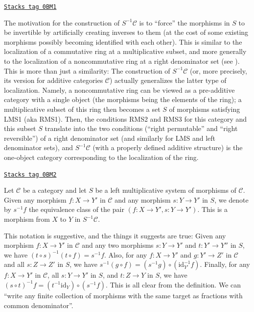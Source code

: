 \begin{remark}
\label{categories-remark-motivation-localization}
\href{https://stacks.math.columbia.edu/tag/0BM1}{\texttt{Stacks tag 0BM1}}

The motivation for the construction of $S^{-1} \mathcal{C}$ is to
``force'' the morphisms in $S$ to be invertible by artificially
creating inverses to them (at the cost of some existing morphisms
possibly becoming identified with each other). This is similar to
the localization of a commutative ring at a multiplicative subset,
and more generally to the localization of a noncommutative ring
at a right denominator set (see \cite[Section 10A]{Lam}). This is
more than just a similarity: The construction of
$S^{-1} \mathcal{C}$ (or, more precisely, its version for
additive categories $\mathcal{C}$) actually generalizes the
latter type of localization. Namely, a noncommutative ring can be
viewed as a pre-additive category with a single object (the morphisms
being the elements of the ring); a multiplicative subset of this
ring then becomes a set $S$ of morphisms satisfying LMS1 (aka
RMS1). Then, the conditions RMS2 and RMS3 for this category and
this subset $S$ translate into the two conditions
(``right permutable'' and ``right reversible'') of a right
denominator set (and similarly for LMS and left denominator sets),
and $S^{-1} \mathcal{C}$ (with a properly defined additive
structure) is the one-object category corresponding to the
localization of the ring.
\end{remark}

\begin{definition}
\label{categories-definition-left-localization-as-fraction}
\href{https://stacks.math.columbia.edu/tag/0BM2}{\texttt{Stacks tag 0BM2}}

Let $\mathcal{C}$ be a category and let $S$ be a left multiplicative
system of morphisms of $\mathcal{C}$. Given any morphism
$f : X \to Y'$ in $\mathcal{C}$ and any morphism $s : Y \to Y'$ in
$S$, we denote by {\it $s^{-1} f$} the equivalence class of the pair
$(f : X \to Y', s : Y \to Y')$. This is a morphism from $X$ to $Y$
in $S^{-1} \mathcal{C}$.
\end{definition}

This notation is suggestive, and the things it suggests are true:
Given any morphism $f : X \to Y'$ in $\mathcal{C}$ and any two
morphisms $s : Y \to Y'$ and $t : Y' \to Y''$ in $S$, we have
$\left(t \circ s\right)^{-1} \left(t \circ f\right) = s^{-1} f$.
Also, for any
$f : X \to Y'$ and $g : Y' \to Z'$ in $\mathcal{C}$ and all
$s : Z \to Z'$ in $S$, we have
$s^{-1} \left(g \circ f\right) = \left(s^{-1} g\right) \circ
\left(\text{id}_{Y'}^{-1} f\right)$.
Finally, for any $f : X \to Y'$ in $\mathcal{C}$, all
$s : Y \to Y'$ in $S$, and $t : Z \to Y$ in $S$, we have
$\left(s \circ t\right)^{-1} f
= \left(t^{-1} \text{id}_Y\right)
\circ \left(s^{-1} f\right)$.
This is all clear from the definition.
We can ``write any finite collection of morphisms with the same target
as fractions with common denominator''.

